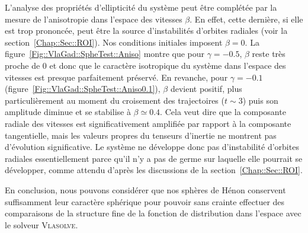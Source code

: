 		L'analyse des propriétés d'ellipticité du système peut être complétée par la
		mesure de l'anisotropie dans l'espace des vitesses $\beta$. En effet, cette dernière, si elle est trop prononcée, peut être la source d'instabilités
		d'orbites
		radiales (voir la section~\ref{Chap::Sec::ROI}). Nos conditions initiales imposent $\beta=0$. La figure~\ref{Fig::VlaGad::SpheTest::Aniso} montre que pour
		$\gamma=-0.5$, $\beta$ reste très proche de $0$ et donc que le caractère isotropique du système dans l'espace des vitesses est presque parfaitement
		préservé. En revanche, pour $\gamma=-0.1$ (figure~\ref{Fig::VlaGad::SpheTest::Aniso0.1}), $\beta$ devient positif, plus particulièrement au moment
		du croisement des trajectoires ($t\sim 3$) puis son amplitude diminue et se stabilise à $\beta\simeq0.4$.
		Cela veut dire que la composante radiale des vitesses est significativement amplifiée par rapport à la composante tangentielle,
		mais les valeurs propres du tenseurs d'inertie ne montrent pas d'évolution significative. Le système ne développe donc pas d'instabilité d'orbites radiales
		essentiellement parce qu'il n'y a pas de germe sur laquelle elle pourrait se développer,
		comme attendu d'après les discussions de la
		section~\ref{Chap::Sec::ROI}.

		En conclusion, nous pouvons considérer que nos sphères de Hénon conservent suffisamment leur caractère sphérique pour pouvoir sans crainte effectuer
		des comparaisons de la structure fine de la fonction de distribution dans l'espace avec le solveur \textsc{Vlasolve}.




